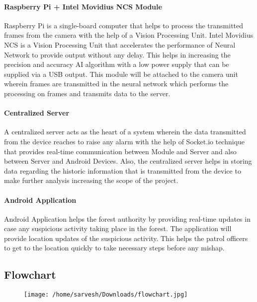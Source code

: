 \documentclass[12pt]{extarticle}
\begin{document}
\paragraph{Raspberry Pi + Intel Movidius NCS Module}
Raspberry Pi is a single-board computer that helps to process the transmitted frames from the camera with the help of a Vision Processing Unit. Intel Movidius NCS is a Vision Processing Unit that accelerates the performance of Neural Network to provide output without any delay. This helps in increasing the precision and accuracy AI algorithm with a low power supply that can be supplied via a USB output. This module will be attached to the camera unit wherein frames are transmitted in the neural network which performs the processing on frames and transmits data to the server.

\paragraph{Centralized Server}
A centralized server acts as the heart of a system wherein the data transmitted from the device reaches to raise any alarm with the help of Socket.io technique that provides real-time communication between Module and Server and also between Server and Android Devices. Also, the centralized server helps in storing data regarding the historic information that is transmitted from the device to make further analysis increasing the scope of the project.

\paragraph{Android Application}
Android Application helps the forest authority by providing real-time updates in case any suspicious activity taking place in the forest. The application will provide location updates of the suspicious activity. This helps the patrol officers to get to the location quickly to take necessary steps before any mishap.

\subsection{Flowchart}
\begin{figure}[h]
	\centering
	\texttt{[image: /home/sarvesh/Downloads/flowchart.jpg]}
\end{figure}
\end{document}
